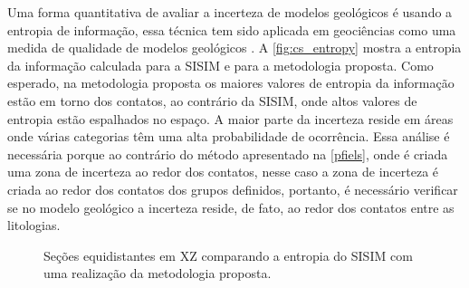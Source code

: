 Uma forma quantitativa de avaliar a incerteza de modelos geológicos é usando a entropia de informação, essa técnica tem sido aplicada em geociências como uma medida de qualidade de modelos geológicos \cite{yang2019assessing}. A \autoref{fig:cs_entropy} mostra a entropia da informação calculada para a SISIM e para a metodologia proposta. Como esperado, na metodologia proposta os maiores valores de entropia da informação estão em torno dos contatos, ao contrário da SISIM, onde altos valores de entropia estão espalhados no espaço. A maior parte da incerteza reside em áreas onde várias categorias têm uma alta probabilidade de ocorrência. Essa análise é necessária porque ao contrário do método apresentado na \autoref{pfiels}, onde é criada uma zona de incerteza ao redor dos contatos, nesse caso a zona de incerteza é criada ao redor dos contatos dos grupos definidos, portanto, é necessário verificar se no modelo geológico a incerteza reside, de fato, ao redor dos contatos entre as litologias.

\begin{figure}[H]
    \caption{Seções equidistantes em XZ comparando a entropia do SISIM com uma realização da metodologia proposta.} \label{fig:cs_entropy}
     \centering
     \hspace{1em}
\end{figure}

